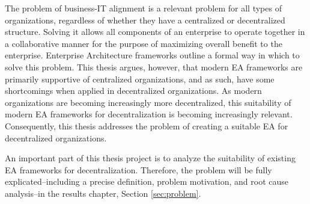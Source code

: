 The problem of business-IT alignment is a relevant problem for all types of organizations, regardless of whether they have a centralized or decentralized structure. Solving it allows all components of an enterprise to operate together in a collaborative manner for the purpose of maximizing overall benefit to the enterprise. Enterprise Architecture frameworks outline a formal way in which to solve this problem. This thesis argues, however, that modern EA frameworks are primarily supportive of centralized organizations, and as such, have some shortcomings when applied in decentralized organizations. As modern organizations are becoming increasingly more decentralized, this suitability of modern EA frameworks for decentralization is becoming increasingly relevant. Consequently, this thesis addresses the problem of creating a suitable EA for decentralized organizations.

An important part of this thesis project is to analyze the suitability of existing EA frameworks for decentralization. Therefore, the problem will be fully explicated--including a precise definition, problem motivation, and root cause analysis--in the results chapter, Section \ref{sec:problem}.

